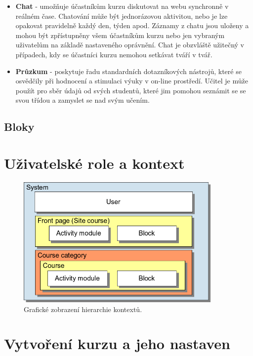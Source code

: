 \documentclass[
print,
  11pt,
  table,   
  nolof,    
  nolot,
  oneside,
  draft
]{fithesis3}
\begin{document}
\begin{itemize}
\item \textbf{Chat} - umožňuje účastníkům kurzu diskutovat na webu synchronně v reálném čase. Chatování může být jednorázovou aktivitou, nebo je lze opakovat pravidelně každý den, týden apod. Záznamy z chatu jsou uloženy a mohou být zpřístupněny všem účastníkům kurzu nebo jen vybraným uživatelům na základě nastaveného oprávnění. Chat je obzvláště užitečný v případech, kdy se účastníci kurzu nemohou setkávat tváří v tvář.
\item \textbf{Průzkum} - poskytuje řadu standardních dotazníkových nástrojů, které se osvědčily při hodnocení a stimulaci výuky v on-line prostředí. Učitel je může použít pro sběr údajů od svých studentů, které jim pomohou seznámit se se svou třídou a zamyslet se nad svým učením.

\end{itemize}
		\subsection{Bloky}
	\section{Uživatelské role a kontext}

		\begin{figure}
		  \begin{center}
		    \includegraphics[width=100mm]{images/moodle-context.png}
		   \end{center}
		  \caption{Grafické zobrazení hierarchie kontextů.   \cite{moodle-context}}
		  \label{fig:moodlecontext}
		\end{figure}

	\section{Vytvoření kurzu a jeho nastaven}
\end{document}
